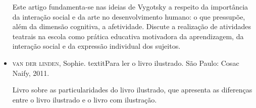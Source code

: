 \documentclass[11pt]{extarticle}
\begin{document}
\begin{itemize}
Este artigo fundamenta-se nas ideias de Vygotsky a respeito da importância
da interação social e da arte no desenvolvimento humano: o que pressupõe,
além da dimensão cognitiva, a afetividade. Discute a realização de atividades teatrais na escola como prática educativa motivadora da aprendizagem, da interação social e da expressão individual dos sujeitos. 


\item \textsc{van der linden}, Sophie. textit{Para ler o livro ilustrado}. São Paulo: Cosac Naify, 2011.

Livro sobre as particularidades do livro ilustrado, que apresenta as diferenças entre o livro ilustrado e o livro com ilustração. 
\end{itemize}
\end{document}
